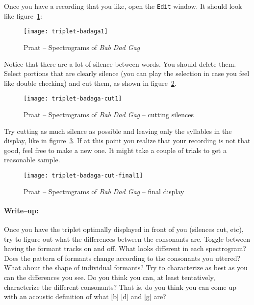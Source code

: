 \documentclass{article}
\newcommand{\soft}[1]{\textsf{#1}}
\newcommand{\softmenu}[1]{\texttt{#1}}
\newcommand{\Praat}{\soft{Praat}}
\begin{document}
Once you have a recording that you like, open the \softmenu{Edit} window. It should look like figure~\ref{step1triplet}:

\begin{figure}[!tbp]
\caption{\Praat{} -- Spectrograms of \emph{Bab Dad Gag}}
\label{step1triplet}
	\begin{center}
		\texttt{[image: triplet-badaga1]}
	\end{center}
\end{figure}

Notice that there are a lot of silence between words. You should delete them. Select portions that are clearly silence (you can play the selection in case you feel like double checking) and cut them, as shown in figure~\ref{step2triplet}.

\begin{figure}[!tbp]
\caption{\Praat{} -- Spectrograms of \emph{Bab Dad Gag} -- cutting silences}
\label{step2triplet}
	\begin{center}
		\texttt{[image: triplet-badaga-cut1]}
	\end{center}
\end{figure}

Try cutting as much silence as possible and leaving only the syllables in the display, like in figure~\ref{step3triplet}. If at this point you realize that your recording is not that good, feel free to make a new one. It might take a couple of trials to get a reasonable sample.

\begin{figure}[!tbp]
\caption{\Praat{} -- Spectrograms of \emph{Bab Dad Gag} -- final display}
\label{step3triplet}
	\begin{center}
		\texttt{[image: triplet-badaga-cut-final1]}
	\end{center}
\end{figure}

\paragraph{Write--up:} Once you have the triplet optimally displayed in front of you (silences cut, etc), try to figure out what the differences between the consonants are. Toggle between having the formant tracks on and off. What looks different in each spectrogram? Does the pattern of formants change according to the consonants you uttered? What about the shape of individual formants? Try to characterize as best as you can the differences you see. Do you think you can, at least tentatively, characterize the different consonants? That is, do you think you can come up with an acoustic definition of what [b] [d] and [g] are?
\end{document}
